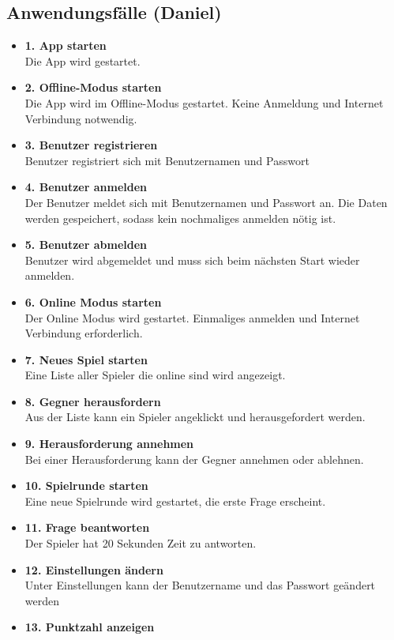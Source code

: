 \documentclass[fontsize=12pt,paper=a4,twoside]{scrartcl}
\begin{document}
\subsection{Anwendungsfälle (Daniel)}
\begin{itemize}
	\item \textbf{1. App starten}\\
	Die App wird gestartet. 
	\item \textbf{2. Offline-Modus starten}\\
	Die App wird im Offline-Modus gestartet. Keine Anmeldung und Internet Verbindung notwendig.
	\item \textbf{3. Benutzer registrieren}\\
	Benutzer registriert sich mit Benutzernamen und Passwort
	\item \textbf{4. Benutzer anmelden}\\
	Der Benutzer meldet sich mit Benutzernamen und Passwort an. Die Daten werden gespeichert, sodass kein nochmaliges anmelden nötig ist.
	\item \textbf{5. Benutzer abmelden}\\
	Benutzer wird abgemeldet und muss sich beim nächsten Start wieder anmelden.
	\item \textbf{6. Online Modus starten}\\
	Der Online Modus wird gestartet. Einmaliges anmelden und Internet Verbindung erforderlich.
	\item \textbf{7. Neues Spiel starten}\\
	Eine Liste aller Spieler die online sind wird angezeigt.
	\item \textbf{8. Gegner herausfordern}\\
	Aus der Liste kann ein Spieler angeklickt und herausgefordert werden.
	\item \textbf{9. Herausforderung annehmen}\\
	Bei einer Herausforderung kann der Gegner annehmen oder ablehnen.
	\item \textbf{10. Spielrunde starten}\\
	Eine neue Spielrunde wird gestartet, die erste Frage erscheint.
	\item \textbf{11. Frage beantworten}\\
	Der Spieler hat 20 Sekunden Zeit zu antworten.
	\item \textbf{12. Einstellungen ändern}\\
	Unter Einstellungen kann der Benutzername und das Passwort geändert werden
	\item \textbf{13. Punktzahl anzeigen}\\

\end{itemize}
\end{document}
